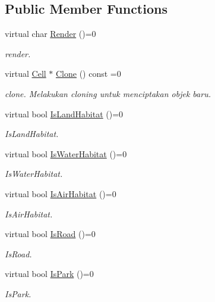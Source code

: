 \subsection*{Public Member Functions}
\begin{DoxyCompactItemize}
\item 
virtual char \hyperlink{classCell_a1d72940d69d96132a445212155e3e789}{Render} ()=0
\begin{DoxyCompactList}\small\item\em render. \end{DoxyCompactList}\item 
virtual \hyperlink{classCell}{Cell} $\ast$ \hyperlink{classCell_aaa64e56d1ecf0d0a390f2400c189b169}{Clone} () const =0
\begin{DoxyCompactList}\small\item\em clone. Melakukan cloning untuk menciptakan objek baru. \end{DoxyCompactList}\item 
virtual bool \hyperlink{classCell_a6cc005c27ee600d76a91459b7733b90e}{Is\+Land\+Habitat} ()=0
\begin{DoxyCompactList}\small\item\em Is\+Land\+Habitat. \end{DoxyCompactList}\item 
virtual bool \hyperlink{classCell_af620aac2cb7ce59657ca158255462fef}{Is\+Water\+Habitat} ()=0
\begin{DoxyCompactList}\small\item\em Is\+Water\+Habitat. \end{DoxyCompactList}\item 
virtual bool \hyperlink{classCell_a24f8abceee9ce115d47b588992407a4d}{Is\+Air\+Habitat} ()=0
\begin{DoxyCompactList}\small\item\em Is\+Air\+Habitat. \end{DoxyCompactList}\item 
virtual bool \hyperlink{classCell_a6afd033fa34492761e1de9fd1f7c8a95}{Is\+Road} ()=0
\begin{DoxyCompactList}\small\item\em Is\+Road. \end{DoxyCompactList}\item 
virtual bool \hyperlink{classCell_ad87cbdb9c06b19c7c6571053c3888a51}{Is\+Park} ()=0
\begin{DoxyCompactList}\small\item\em Is\+Park. \end{DoxyCompactList}\item 

\end{DoxyCompactItemize}
